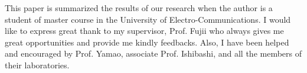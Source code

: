 \begin{acknowledgments}
This paper is summarized the results of our research when the author is a student of
master course in the University of Electro-Communications. I would like to express great
thank to my supervisor, Prof. Fujii who always gives me great opportunities and provide
me kindly feedbacks. Also, I have been helped and encouraged by Prof. Yamao, associate
Prof. Ishibashi, and all the members of their laboratories.
\end{acknowledgments}
